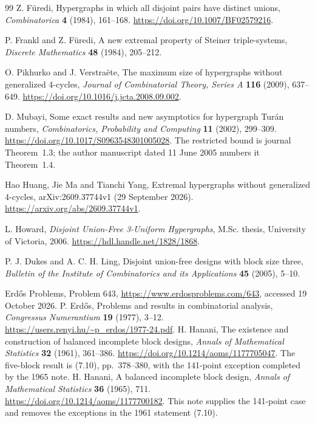 \begingroup\small
\begin{thebibliography}{99}
Z. F\"uredi,
Hypergraphs in which all disjoint pairs have distinct unions,
\emph{Combinatorica} \textbf{4} (1984), 161--168.
\url{https://doi.org/10.1007/BF02579216}.

P. Frankl and Z. F\"uredi,
A new extremal property of Steiner triple-systems,
\emph{Discrete Mathematics} \textbf{48} (1984), 205--212.

O. Pikhurko and J. Verstra\"ete,
The maximum size of hypergraphs without generalized 4-cycles,
\emph{Journal of Combinatorial Theory, Series A}
\textbf{116} (2009), 637--649.
\url{https://doi.org/10.1016/j.jcta.2008.09.002}.

D. Mubayi,
Some exact results and new asymptotics for hypergraph Tur\'an numbers,
\emph{Combinatorics, Probability and Computing}
\textbf{11} (2002), 299--309.
\url{https://doi.org/10.1017/S0963548301005028}.
The restricted bound is journal Theorem~1.3; the author manuscript dated
11 June 2005 numbers it Theorem~1.4.

Hao Huang, Jie Ma and Tianchi Yang,
Extremal hypergraphs without generalized 4-cycles,
arXiv:2609.37744v1 (29 September 2026).
\url{https://arxiv.org/abs/2609.37744v1}.

L. Howard,
\emph{Disjoint Union-Free 3-Uniform Hypergraphs},
M.Sc. thesis, University of Victoria, 2006.
\url{https://hdl.handle.net/1828/1868}.

P. J. Dukes and A. C. H. Ling,
Disjoint union-free designs with block size three,
\emph{Bulletin of the Institute of Combinatorics and its Applications}
\textbf{45} (2005), 5--10.

Erd\H{o}s Problems, Problem 643,
\url{https://www.erdosproblems.com/643}, accessed 19 October 2026.
P. Erd\H{o}s, Problems and results in combinatorial analysis,
\emph{Congressus Numerantium} \textbf{19} (1977), 3--12.
\url{https://users.renyi.hu/~p_erdos/1977-24.pdf}.
H. Hanani, The existence and construction of balanced incomplete block designs,
\emph{Annals of Mathematical Statistics} \textbf{32} (1961), 361--386.
\url{https://doi.org/10.1214/aoms/1177705047}.
The five-block result is (7.10), pp.~378--380, with the 141-point exception completed by the 1965 note.
H. Hanani, A balanced incomplete block design,
\emph{Annals of Mathematical Statistics} \textbf{36} (1965), 711.
\url{https://doi.org/10.1214/aoms/1177700182}.
This note supplies the 141-point case and removes the exceptions in the 1961 statement (7.10).
\end{thebibliography}
\endgroup

